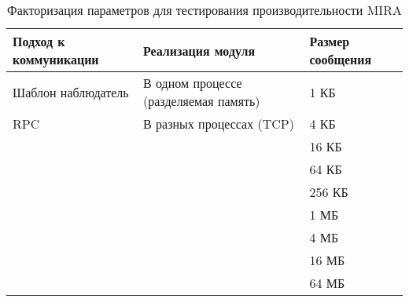 \begin{table}[]
	\centering
	\caption{Факторизация параметров для тестирования производительности MIRA}
	\label{table:chapter2:mira_test_cases}
	\def\arraystretch{1.3}
		\begin{tabular}{|p{5cm}|p{4cm}|p{4cm}|}
			\hline
			\textbf{Подход к коммуникации} & \textbf{Реализация модуля} & \textbf{Размер сообщения} \\ \hline
			Шаблон наблюдатель & В одном процессе (разделяемая память) & 1 КБ   \\ \hline
			RPC                & В разных процессах (TCP)              & 4 КБ   \\ \hline
			\multirow{8}{*}{}  & \multirow{8}{*}{}                     & 16 КБ  \\ \cline{3-3} 
			                   &                                       & 64 КБ  \\ \cline{3-3} 
			                   &                                       & 256 КБ \\ \cline{3-3} 
			                   &                                       & 1 МБ   \\ \cline{3-3} 
			                   &                                       & 4 МБ   \\ \cline{3-3}
			                   &                                       & 16 МБ  \\ \cline{3-3}
  			                   &                                       & 64 МБ  \\ \hline
		\end{tabular}%
	
\end{table}
